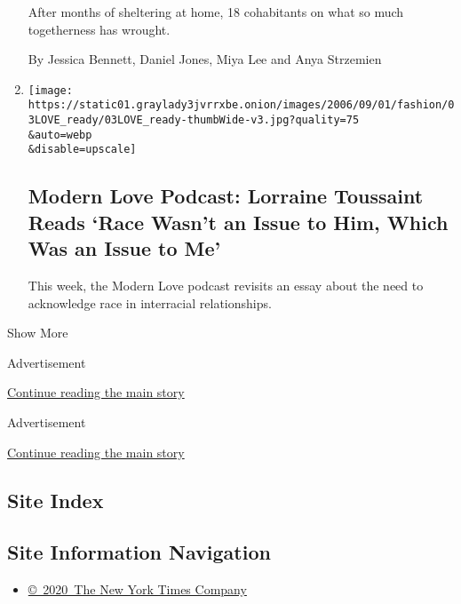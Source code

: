 \begin{enumerate}
  After months of sheltering at home, 18 cohabitants on what so much
  togetherness has wrought.

  By Jessica Bennett, Daniel Jones, Miya Lee and Anya Strzemien
\item
  \href{/2020/06/10/style/modern-love-podcast-lorraine-toussant-updated-poscript.html}{}

  \texttt{[image: https://static01.graylady3jvrrxbe.onion/images/2006/09/01/fashion/03LOVE\_ready/03LOVE\_ready-thumbWide-v3.jpg?quality=75\\\&auto=webp\\\&disable=upscale]}

  \hypertarget{modern-love-podcast-lorraine-toussaint-reads-race-wasnt-an-issue-to-him-which-was-an-issue-to-me}{%
  \subsection{Modern Love Podcast: Lorraine Toussaint Reads `Race Wasn't
  an Issue to Him, Which Was an Issue to
  Me'}\label{modern-love-podcast-lorraine-toussaint-reads-race-wasnt-an-issue-to-him-which-was-an-issue-to-me}}

  This week, the Modern Love podcast revisits an essay about the need to
  acknowledge race in interracial relationships.
\end{enumerate}

Show More

Advertisement

\protect\hyperlink{after-mid2}{Continue reading the main story}

Advertisement

\protect\hyperlink{after-mktg}{Continue reading the main story}

\hypertarget{site-index}{%
\subsection{Site Index}\label{site-index}}

\hypertarget{site-information-navigation}{%
\subsection{Site Information
Navigation}\label{site-information-navigation}}

\begin{itemize}
\tightlist
\item
  \href{https://help.nytimes3xbfgragh.onion/hc/en-us/articles/115014792127-Copyright-notice}{©~2020~The
  New York Times Company}
\end{itemize}

